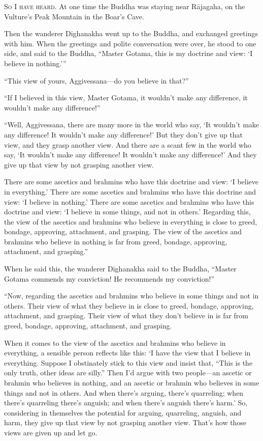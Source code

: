 \documentclass[12pt,openany]{book}%
\newcommand*{\scevam}[1]{\textsc{#1}}
\begin{document}
\scevam{So I have heard. }At one time the Buddha was staying near \textsanskrit{Rājagaha}, on the Vulture’s Peak Mountain in the Boar’s Cave. 

Then the wanderer \textsanskrit{Dīghanakha} went up to the Buddha, and exchanged greetings with him. When the greetings and polite conversation were over, he stood to one side, and said to the Buddha, “Master Gotama, this is my doctrine and view: ‘I believe in nothing.’” 

“This view of yours, Aggivessana—do you believe in that?” 

“If I believed in this view, Master Gotama, it wouldn’t make any difference, it wouldn’t make any difference!” 

“Well, Aggivessana, there are many more in the world who say, ‘It wouldn’t make any difference! It wouldn’t make any difference!’ But they don’t give up that view, and they grasp another view. And there are a scant few in the world who say, ‘It wouldn’t make any difference! It wouldn’t make any difference!’ And they give up that view by not grasping another view. 

There are some ascetics and brahmins who have this doctrine and view: ‘I believe in everything.’ There are some ascetics and brahmins who have this doctrine and view: ‘I believe in nothing.’ There are some ascetics and brahmins who have this doctrine and view: ‘I believe in some things, and not in others.’ Regarding this, the view of the ascetics and brahmins who believe in everything is close to greed, bondage, approving, attachment, and grasping. The view of the ascetics and brahmins who believe in nothing is far from greed, bondage, approving, attachment, and grasping.” 

When he said this, the wanderer \textsanskrit{Dīghanakha} said to the Buddha, “Master Gotama commends my conviction! He recommends my conviction!” 

“Now, regarding the ascetics and brahmins who believe in some things and not in others. Their view of what they believe in is close to greed, bondage, approving, attachment, and grasping. Their view of what they don’t believe in is far from greed, bondage, approving, attachment, and grasping. 

When it comes to the view of the ascetics and brahmins who believe in everything, a sensible person reflects like this: ‘I have the view that I believe in everything. Suppose I obstinately stick to this view and insist that, “This is the only truth, other ideas are silly.” Then I’d argue with two people—an ascetic or brahmin who believes in nothing, and an ascetic or brahmin who believes in some things and not in others. And when there’s arguing, there’s quarreling; when there’s quarreling there’s anguish; and when there’s anguish there’s harm.’ So, considering in themselves the potential for arguing, quarreling, anguish, and harm, they give up that view by not grasping another view. That’s how those views are given up and let go. 
\end{document}
